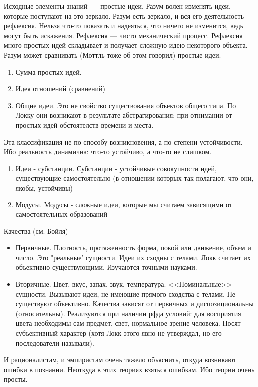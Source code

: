 Исходные элементы знаний~--- простые идеи. Разум волен изменять идеи, которые поступают
на это зеркало. Разум есть зеркало, и вся его деятельность - рефлексия. Нельзя что-то показать и надеяться, что ничего не изменится, ведь могут быть искажения. Рефлексия --- чисто механический процесс. Рефлексия много простых идей складывает и получает сложную идею некоторого объекта. Разум может сравнивать (Моттль тоже об этом говорил) простые идеи.
\begin{enumerate}
	\item Сумма простых идей.
	\item Идея отношений (сравнений)
	\item Общие идеи. Это не свойство существования объектов общего типа. По Локку они возникают в результате абстрагирования: при отнимании от простых идей обстоятелств времени и места.
\end{enumerate}
	
Эта классификация не по способу возникновения, а по степени устойчивости. Ибо реальность динамична: что-то устойчиво, а что-то не слишком.
\begin{enumerate}
	\item Идеи - субстанции. Субстанции - устойчивые совокупности идей, существующие самостоятельно (в отношении которых так полагают, что они, якобы, устойчивы)
	\item Модусы. Модусы - сложные идеи, которые мы считаем зависящими от самостоятельных образований
\end{enumerate}
	
Качества (см. Бойля)
\begin{itemize}
 	\item Первичные. Плотность, протяженность форма, покой или движение, объем и число. Это "реальные' сущности. Идеи их сходны с телами. Локк считает их объективно существующими. Изучаются точными науками.
	\item Вторичные. Цвет, вкус, запах, звук, температура. <<Номинальные>> сущности. Вызывают идеи, не имеющие прямого сходства с телами. Не существуют объективно. Качества зависят от первичных и диспозициональны (относительны). Реализуются при наличии рфда условий: для восприятия цвета необходимы сам предмет, свет, нормальное зрение человека. Носят субъективный характер (хотя Локк этого явно не утверждал, но его последователи называли).
\end{itemize} 

И рационалистам, и эмпиристам очень тяжело объяснить, откуда возникают ошибки в познании. Неоткуда в этих теориях взяться ошибкам. Ибо теории очень просты.


